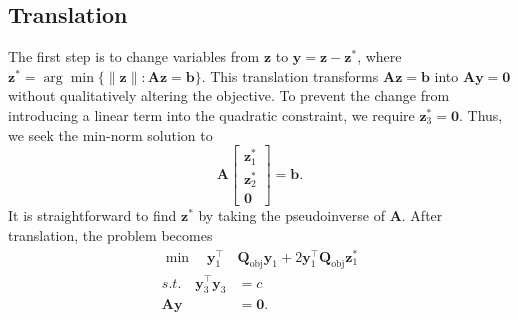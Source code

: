 \documentclass[journal,twoside]{IEEEtran}
\renewcommand{\vec}[1]{\mathbf{#1}}
\begin{document}
\subsection{Translation}\label{sec:solution-translation}
The first step is to change variables from $\vec{z}$ to $\vec{y}=\vec{z}-\vec{z}^*$, where
$\vec{z}^* = \arg\min\{\lVert\vec{z}\rVert :\mathbf{A}\vec{z} = \vec{b}\}$. This translation transforms $\mathbf{A}\vec{z} = \vec{b}$ into $\mathbf{A}\vec{y} = \vec{0}$ without qualitatively altering the objective. To
prevent the change from introducing a linear term into the quadratic
constraint, we require $\vec{z}_3^* = \vec{0}$. Thus, we seek the min-norm solution to
\begin{equation}\label{eq:min-norm}
\mathbf{A} \begin{bmatrix} \vec{z}_1^* \\ \vec{z}_2^*
\\ \vec{0} \end{bmatrix} = \vec{b}.
\end{equation}
It is straightforward to find $\vec{z}^*$ by taking the pseudoinverse of $\mathbf{A}$. After translation, the problem becomes
\begin{subequations}\label{eq:translate}
\begin{align}
\label{eq:translate-obj} \min\quad \vec{y}_1^\top &\mathbf{Q}_\text{obj} \vec{y}_1 + 2 \vec{y}_1^\top \mathbf{Q}_\text{obj} \vec{z}_1^* \\
\label{eq:translate-quad} s.t.\quad \vec{y}_3^\top \vec{y}_3 &= c \\
\label{eq:translate-lin} \mathbf{A}\vec{y} &= \vec{0}.
\end{align}
\end{subequations}
\end{document}
